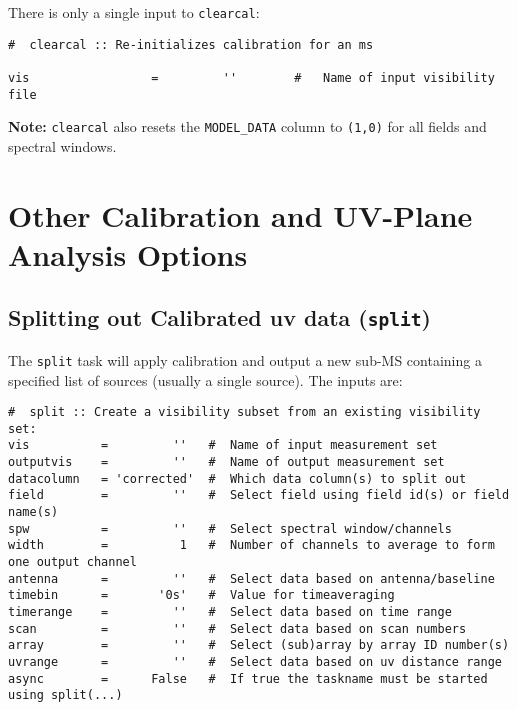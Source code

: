 There is only a single input to {\tt clearcal}:
\small
\begin{verbatim}
#  clearcal :: Re-initializes calibration for an ms

vis                 =         ''        #   Name of input visibility file

\end{verbatim}
\normalsize

{\bf Note:} {\tt clearcal} also resets the {\tt MODEL\_DATA} column
to {\tt (1,0)} for all fields and spectral windows.

\section{Other Calibration and UV-Plane Analysis Options}
\label{section:cal.other}

\subsection{Splitting out Calibrated uv data ({\tt split})}
\label{section:cal.other.split}

The {\tt split} task will apply calibration and output a new sub-MS
containing a specified list of sources (usually a single source).
The inputs are:
\small
\begin{verbatim}
#  split :: Create a visibility subset from an existing visibility set:
vis          =         ''   #  Name of input measurement set
outputvis    =         ''   #  Name of output measurement set
datacolumn   = 'corrected'  #  Which data column(s) to split out
field        =         ''   #  Select field using field id(s) or field name(s)
spw          =         ''   #  Select spectral window/channels
width        =          1   #  Number of channels to average to form one output channel
antenna      =         ''   #  Select data based on antenna/baseline
timebin      =       '0s'   #  Value for timeaveraging
timerange    =         ''   #  Select data based on time range
scan         =         ''   #  Select data based on scan numbers
array        =         ''   #  Select (sub)array by array ID number(s)
uvrange      =         ''   #  Select data based on uv distance range
async        =      False   #  If true the taskname must be started using split(...)
\end{verbatim}
\normalsize

